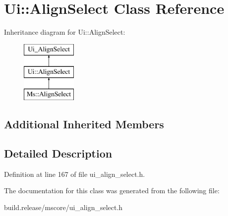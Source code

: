 \hypertarget{class_ui_1_1_align_select}{}\section{Ui\+:\+:Align\+Select Class Reference}
\label{class_ui_1_1_align_select}
Inheritance diagram for Ui\+:\+:Align\+Select\+:\begin{figure}[H]
\begin{center}
\leavevmode
\includegraphics[height=3.000000cm]{class_ui_1_1_align_select}
\end{center}
\end{figure}
\subsection*{Additional Inherited Members}


\subsection{Detailed Description}


Definition at line 167 of file ui\+\_\+align\+\_\+select.\+h.



The documentation for this class was generated from the following file\+:\begin{DoxyCompactItemize}
\item 
build.\+release/mscore/ui\+\_\+align\+\_\+select.\+h\end{DoxyCompactItemize}
